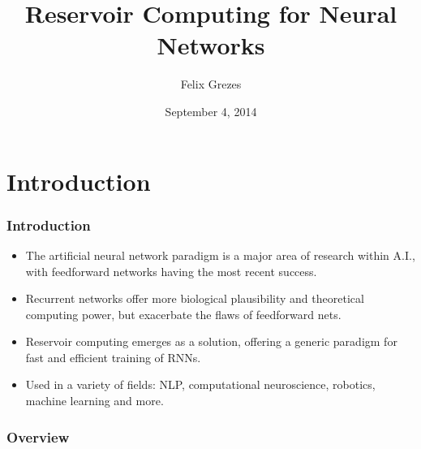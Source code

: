 \documentclass{beamer}
\title[Reservoir Computing]{Reservoir Computing for Neural Networks} %
\author{Felix Grezes} %
\institute[CUNY] %
{
CUNY Graduate Center \\ %
\medskip
\textit{fgrezes@gc.cuny.edu} %
}
\date{September 4, 2014}
\begin{document}


\begin{frame}
\titlepage %
\end{frame}

\section{Introduction}

\begin{frame}
\frametitle{Introduction}


\begin{itemize}
\item The artificial neural network paradigm is a major area of research within A.I., with feedforward networks having the most recent success.
\item Recurrent networks offer more biological plausibility and theoretical computing power, but exacerbate the flaws of feedforward nets. 
\item Reservoir computing emerges as a solution, offering a generic paradigm for fast and efficient training of RNNs.
\item Used in a variety of fields: NLP, computational neuroscience, robotics, machine learning and more.
\end{itemize}


\end{frame}


\begin{frame}
\frametitle{Overview} %
\tableofcontents %
\end{frame}
\end{document}
